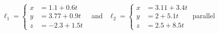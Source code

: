 {$\ell_1 = \left\{\begin{aligned} x&= 1.1+0.6t\\ y&= 3.77+0.9t\\ z&= -2.3+1.5t\end{aligned}\right.$ \ and \ 
$\ell_2 = \left\{\begin{aligned} x&= 3.11+3.4t\\ y&= 2+5.1t\\ z&= 2.5+8.5t\end{aligned}\right.$
}
{parallel
}

